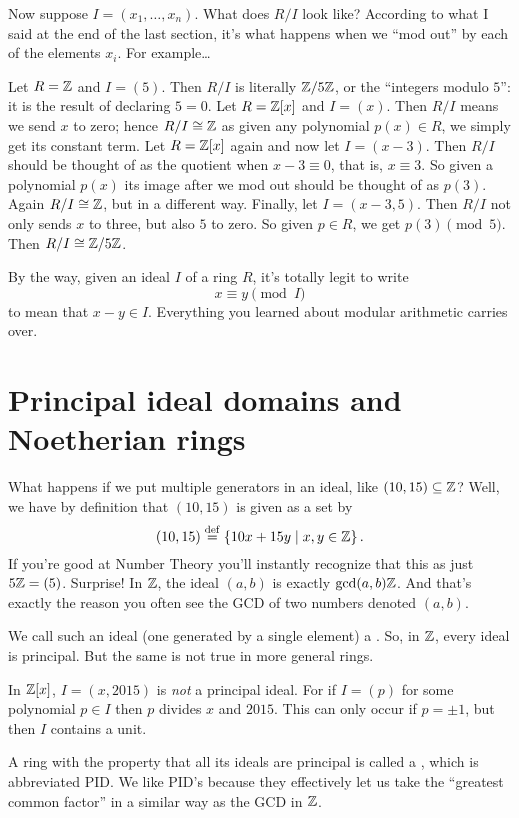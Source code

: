 Now suppose $I = (x_1, \dots, x_n)$.
What does $R/I$ look like?
According to what I said at the end of the last section,
it's what happens when we ``mod out'' by each of the elements $x_i$.
For example\dots
\begin{example}
	\listhack
	\begin{enumerate}[(a)]
		\ii Let $R = \mathbb Z$ and $I = (5)$. Then $R/I$ is literally
		$\mathbb Z/5\mathbb Z$, or the ``integers modulo $5$'':
		it is the result of declaring $5 = 0$.
		\ii Let $R = \mathbb Z[x]$ and $I = (x)$.
		Then $R/I$ means we send $x$ to zero; hence $R/I \cong \mathbb Z$
		as given any polynomial $p(x) \in R$,
		we simply get its constant term.
		\ii Let $R = \mathbb Z[x]$ again and now let $I = (x-3)$.
		Then $R/I$ should be thought of as the quotient when $x-3 \equiv 0$,
		that is, $x \equiv 3$.
		So given a polynomial $p(x)$ its image after
		we mod out should be thought of as $p(3)$.
		Again $R/I \cong \mathbb Z$, but in a different way.
		\ii Finally, let $I = (x-3,5)$.
		Then $R/I$ not only sends $x$ to three, but also $5$ to zero.
		So given $p \in R$, we get $p(3) \pmod 5$.
		Then $R/I \cong \mathbb Z/5\mathbb Z$.
	\end{enumerate}
\end{example}
By the way, given an ideal $I$ of a ring $R$, it's totally legit to write
\[ x \equiv y \pmod I \]
to mean that $x-y \in I$.
Everything you learned about modular arithmetic carries over.

\section{Principal ideal domains and Noetherian rings}

What happens if we put multiple generators in an ideal, like $(10,15) \subseteq \mathbb Z$?
Well, we have by definition that $(10,15)$ is given as a set by
\[ 
	(10,15) \overset{\mathrm{def}}{=} \left\{ 10x + 15y \mid x,y \in \mathbb Z \right\}.
\]
If you're good at Number Theory you'll instantly recognize that this as just $5\mathbb Z = (5)$.
Surprise! In $\mathbb Z$, the ideal $(a,b)$ is exactly $\gcd(a,b) \mathbb Z$.
And that's exactly the reason you often see the GCD of two numbers denoted $(a,b)$.

We call such an ideal (one generated by a single element) a .
So, in $\mathbb Z$, every ideal is principal.
But the same is not true in more general rings.
\begin{example}
	In $\mathbb Z[x]$, $I = (x,2015)$ is \emph{not} a principal ideal.
	For if $I = (p)$ for some polynomial $p \in I$
	then $p$ divides $x$ and $2015$.
	This can only occur if $p = \pm 1$,
	but then $I$ contains a unit.
\end{example}
A ring with the property that all its ideals are principal is called a ,
which is abbreviated PID.
We like PID's because they effectively let us take the ``greatest common factor''
in a similar way as the GCD in $\mathbb Z$.

